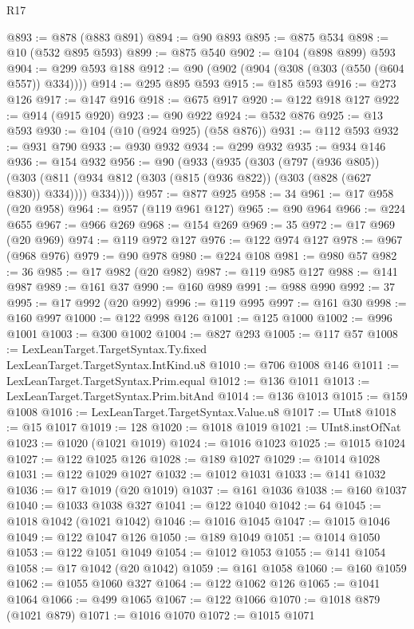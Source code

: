 \begin{lexlean}{R17}
\begin{coremodule}
@893 := @878 (@883 @891)
@894 := @90 @893
@895 := @875 @534
@898 := @10 (@532 @895 @593)
@899 := @875 @540
@902 := @104 (@898 @899) @593
@904 := @299 @593 @188
@912 := @90 (@902 (@904 (@308 (@303 (@550 (@604 @557)) @334))))
@914 := @295 @895 @593
@915 := @185 @593
@916 := @273 @126
@917 := @147 @916
@918 := @675 @917
@920 := @122 @918 @127
@922 := @914 (@915 @920)
@923 := @90 @922
@924 := @532 @876
@925 := @13 @593
@930 := @104 (@10 (@924 @925) (@58 @876))
@931 := @112 @593
@932 := @931 @790
@933 := @930 @932
@934 := @299 @932
@935 := @934 @146
@936 := @154 @932
@956 := @90
    (@933
      (@935
        (@303
          (@797 (@936 @805))
          (@303 (@811 (@934 @812 (@303 (@815 (@936 @822)) (@303 (@828 (@627 @830)) @334)))) @334))))
@957 := @877 @925
@958 := 34
@961 := @17 @958 (@20 @958)
@964 := @957 (@119 @961 @127)
@965 := @90 @964
@966 := @224 @655
@967 := @966 @269
@968 := @154 @269
@969 := 35
@972 := @17 @969 (@20 @969)
@974 := @119 @972 @127
@976 := @122 @974 @127
@978 := @967 (@968 @976)
@979 := @90 @978
@980 := @224 @108
@981 := @980 @57
@982 := 36
@985 := @17 @982 (@20 @982)
@987 := @119 @985 @127
@988 := @141 @987
@989 := @161 @37
@990 := @160 @989
@991 := @988 @990
@992 := 37
@995 := @17 @992 (@20 @992)
@996 := @119 @995
@997 := @161 @30
@998 := @160 @997
@1000 := @122 @998 @126
@1001 := @125 @1000
@1002 := @996 @1001
@1003 := @300 @1002
@1004 := @827 @293
@1005 := @117 @57
@1008 := LexLeanTarget.TargetSyntax.Ty.fixed LexLeanTarget.TargetSyntax.IntKind.u8
@1010 := @706 @1008 @146
@1011 := LexLeanTarget.TargetSyntax.Prim.equal
@1012 := @136 @1011
@1013 := LexLeanTarget.TargetSyntax.Prim.bitAnd
@1014 := @136 @1013
@1015 := @159 @1008
@1016 := LexLeanTarget.TargetSyntax.Value.u8
@1017 := UInt8
@1018 := @15 @1017
@1019 := 128
@1020 := @1018 @1019
@1021 := UInt8.instOfNat
@1023 := @1020 (@1021 @1019)
@1024 := @1016 @1023
@1025 := @1015 @1024
@1027 := @122 @1025 @126
@1028 := @189 @1027
@1029 := @1014 @1028
@1031 := @122 @1029 @1027
@1032 := @1012 @1031
@1033 := @141 @1032
@1036 := @17 @1019 (@20 @1019)
@1037 := @161 @1036
@1038 := @160 @1037
@1040 := @1033 @1038 @327
@1041 := @122 @1040
@1042 := 64
@1045 := @1018 @1042 (@1021 @1042)
@1046 := @1016 @1045
@1047 := @1015 @1046
@1049 := @122 @1047 @126
@1050 := @189 @1049
@1051 := @1014 @1050
@1053 := @122 @1051 @1049
@1054 := @1012 @1053
@1055 := @141 @1054
@1058 := @17 @1042 (@20 @1042)
@1059 := @161 @1058
@1060 := @160 @1059
@1062 := @1055 @1060 @327
@1064 := @122 @1062 @126
@1065 := @1041 @1064
@1066 := @499 @1065
@1067 := @122 @1066
@1070 := @1018 @879 (@1021 @879)
@1071 := @1016 @1070
@1072 := @1015 @1071

\end{coremodule}
\end{lexlean}
